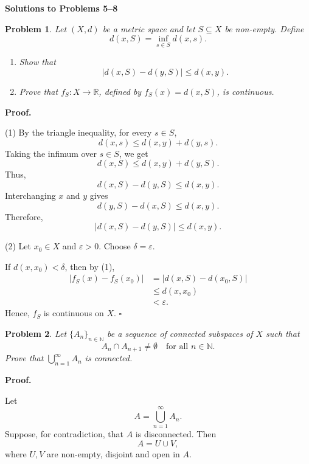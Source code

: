 \documentclass[11pt,a4paper]{article}
\newcommand{\R}{\mathbb{R}}
\newcommand{\N}{\mathbb{N}}
\newtheorem*{problem}{Problem}
\begin{document}
\begin{center}
    {\Large\textbf{Solutions to Problems 5--8}}
\end{center}


\begin{problem}
Let $(X,d)$ be a metric space and let
$S\subseteq X$ be non-empty. Define
\[
d(x,S)=\inf_{s\in S}d(x,s).
\]
\begin{enumerate}[label=(\arabic*)]
    \item Show that
    \[
    |d(x,S)-d(y,S)|\leq d(x,y).
    \]
    \item Prove that $f_S:X\to\R$, defined by
    $f_S(x)=d(x,S)$, is continuous.
\end{enumerate}
\end{problem}

\textbf{Proof.}

(1) By the triangle inequality, for every $s\in S$,
\[
d(x,s)\leq d(x,y)+d(y,s).
\]
Taking the infimum over $s\in S$, we get
\[
d(x,S)\leq d(x,y)+d(y,S).
\]
Thus,
\[
d(x,S)-d(y,S)\leq d(x,y).
\]
Interchanging $x$ and $y$ gives
\[
d(y,S)-d(x,S)\leq d(x,y).
\]
Therefore,
\[
\boxed{|d(x,S)-d(y,S)|\leq d(x,y).}
\]

(2) Let $x_0\in X$ and $\varepsilon>0$.
Choose $\delta=\varepsilon$.

If $d(x,x_0)<\delta$, then by (1),
\[
\begin{aligned}
|f_S(x)-f_S(x_0)|
&=|d(x,S)-d(x_0,S)|\\
&\leq d(x,x_0)\\
&<\varepsilon.
\end{aligned}
\]
Hence, $f_S$ is continuous on $X$.
\hfill $\square$

\vspace{0.5cm}


\begin{problem}
Let $\{A_n\}_{n\in\N}$ be a sequence of connected
subspaces of $X$ such that
\[
A_n\cap A_{n+1}\neq\emptyset
\quad\text{for all }n\in\N.
\]
Prove that $\displaystyle\bigcup_{n=1}^{\infty}A_n$
is connected.
\end{problem}

\textbf{Proof.}

Let
\[
A=\bigcup_{n=1}^{\infty}A_n.
\]
Suppose, for contradiction, that $A$ is disconnected.
Then
\[
A=U\cup V,
\]
where $U,V$ are non-empty, disjoint and open in $A$.
\end{document}
